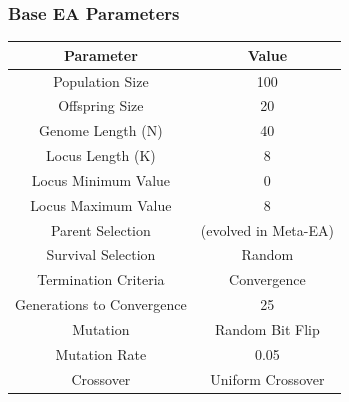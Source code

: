 \documentclass{beamer}
\begin{document}
	\begin{frame}
		\frametitle{Base EA Parameters}
		\begin{table}
			\small
			\begin{tabular}{ c | c | }
			    Parameter & Value\\
			    \hline \hline		    
			    Population Size & 100 \\
			    \hline
			    Offspring Size & 20\\
			    \hline
			    Genome Length (N) & 40 \\
			    \hline
			    Locus Length (K) & 8\\
			    \hline
			    Locus Minimum Value & 0\\
			    \hline
			    Locus Maximum Value & 8\\
			    \hline
			    Parent Selection & (evolved in Meta-EA)\\
			    \hline
			    Survival Selection & Random \\
			    \hline
			    Termination Criteria & Convergence \\
			    \hline
			    Generations to Convergence & 25\\
			    \hline
			    Mutation & Random Bit Flip \\
			    \hline
			    Mutation Rate & 0.05\\
			    \hline
			    Crossover & Uniform Crossover\\
			\end{tabular}
		\end{table}
	\end{frame}	
	
\end{document}
